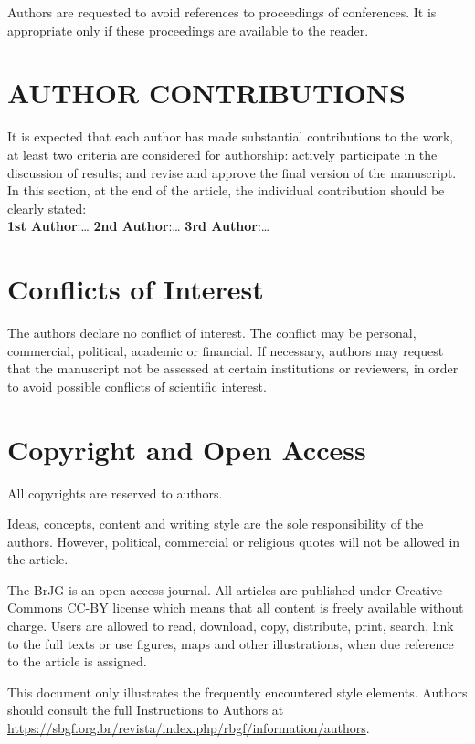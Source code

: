 \documentclass{BrJG_submit}
\begin{document}
Authors are requested to avoid references to proceedings of conferences. It is appropriate only if these proceedings are available to the reader.

\section*{AUTHOR CONTRIBUTIONS}
It is expected that each author has made substantial contributions to the work, at least two criteria are considered for authorship: actively participate in the discussion of results; and revise and approve the final version of the manuscript. In this section, at the end of the article, the individual contribution should be clearly stated:\\ {\bf 1st Author}:… {\bf 2nd Author}:… {\bf 3rd Author}:…

\section*{Conflicts of Interest}
The authors declare no conflict of interest. The conflict may be personal, commercial, political, academic or financial. If necessary, authors may request that the manuscript not be assessed at certain institutions or reviewers, in order to avoid possible conflicts of scientific interest. 

\section*{Copyright and Open Access}
All copyrights are reserved to authors.

Ideas, concepts, content and writing style are the sole responsibility of the authors. However, political, commercial or religious quotes will not be allowed in the article.

The BrJG is an open access journal. All articles are published under Creative Commons CC-BY license which means that all content is freely available without charge. Users are allowed to read, download, copy, distribute, print, search, link to the full texts or use figures, maps and other illustrations, when due reference to the article is assigned.

This document only illustrates the frequently encountered style elements. Authors should consult the full Instructions to Authors at {\href{https://sbgf.org.br/revista/index.php/rbgf/information/authors}{https://sbgf.org.br/revista/index.php/rbgf/information/authors}}.




\end{document}

